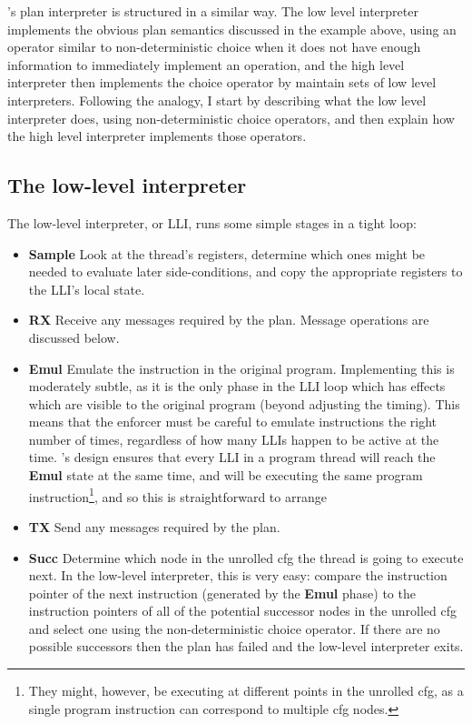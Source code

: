 {\Implementation}'s plan interpreter is structured in a similar way.
The low level interpreter implements the obvious plan semantics
discussed in the example above, using an operator similar to
non-deterministic choice when it does not have enough information to
immediately implement an operation, and the high level interpreter
then implements the choice operator by maintain sets of low level
interpreters.  Following the analogy, I start by describing what the
low level interpreter does, using non-deterministic choice operators,
and then explain how the high level interpreter implements those
operators.

\subsection{The low-level interpreter}
\label{sect:enforce:llis}

The low-level interpreter, or LLI, runs some simple stages in a tight
loop:

\begin{itemize}
\item \textbf{Sample} Look at the thread's registers, determine which
  ones might be needed to evaluate later side-conditions, and copy the
  appropriate registers to the LLI's local state.

\item \textbf{RX} Receive any messages required by the plan.  Message
  operations are discussed below.

\item \textbf{Emul} Emulate the instruction in the original program.
  Implementing this is moderately subtle, as it is the only phase in
  the LLI loop which has effects which are visible to the original
  program (beyond adjusting the timing).  This means that the enforcer
  must be careful to emulate instructions the right number of times,
  regardless of how many LLIs happen to be active at the time.
  {\Technique}'s design ensures that every LLI in a program thread
  will reach the \textbf{Emul} state at the same time, and will be
  executing the same program instruction\footnote{They might, however,
    be executing at different points in the unrolled \gls{cfg}, as a single
    program instruction can correspond to multiple \gls{cfg} nodes.}, and so
  this is straightforward to arrange

\item \textbf{TX} Send any messages required by the plan.

\item \textbf{Succ} Determine which node in the unrolled \gls{cfg} the
  thread is going to execute next.  In the low-level interpreter, this
  is very easy: compare the instruction pointer of the next
  instruction (generated by the \textbf{Emul} phase) to the
  instruction pointers of all of the potential successor nodes in the
  unrolled \gls{cfg} and select one using the non-deterministic choice
  operator.  If there are no possible successors then the plan has
  failed and the low-level interpreter exits.
\end{itemize}

